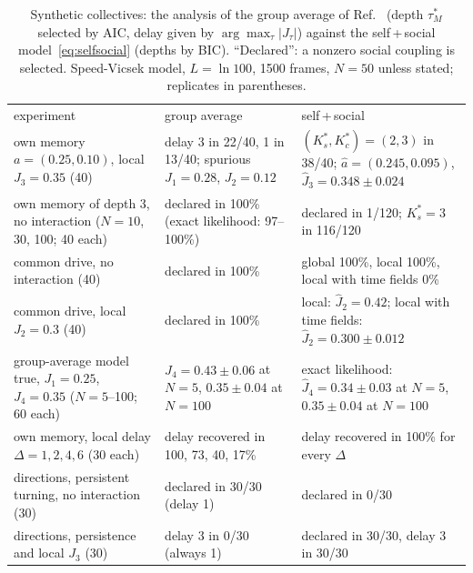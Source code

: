 \begin{table}[t]
\caption{Synthetic collectives: the analysis of the group average of Ref.~\cite{Agliari2024} (depth $\tau_M^*$ selected by AIC, delay given by $\arg\max_\tau|J_\tau|$) against the self\,+\,social model~\eqref{eq:selfsocial} (depths by BIC). ``Declared'': a nonzero social coupling is selected. Speed-Vicsek model, $L=\ln100$, 1500 frames, $N=50$ unless stated; replicates in parentheses.}
\label{tab:collective}
\begin{ruledtabular}
\begin{tabular}{>{\raggedright\arraybackslash}p{5.0cm}>{\raggedright\arraybackslash}p{5.6cm}>{\raggedright\arraybackslash}p{5.6cm}}
experiment & group average & self\,+\,social\\
\colrule
own memory $a=(0.25,0.10)$, local $J_3=0.35$ (40) & delay 3 in 22/40, 1 in 13/40; spurious $J_1=0.28$, $J_2=0.12$ & $(K_s^*,K_c^*)=(2,3)$ in 38/40; $\hat a=(0.245,0.095)$, $\hat J_3=0.348\pm0.024$\\
own memory of depth 3, no interaction ($N=10$, 30, 100; 40 each) & declared in 100\% (exact likelihood: 97--100\%) & declared in 1/120; $K_s^*=3$ in 116/120\\
common drive, no interaction (40) & declared in 100\% & global 100\%, local 100\%, local with time fields 0\%\\
common drive, local $J_2=0.3$ (40) & declared in 100\% & local: $\hat J_2=0.42$; local with time fields: $\hat J_2=0.300\pm0.012$\\
group-average model true, $J_1=0.25$, $J_4=0.35$ ($N=5$--100; 60 each) & $\hat J_4=0.43\pm0.06$ at $N=5$, $0.35\pm0.04$ at $N=100$ & exact likelihood: $\hat J_4=0.34\pm0.03$ at $N=5$, $0.35\pm0.04$ at $N=100$\\
own memory, local delay $\Delta=1,2,4,6$ (30 each) & delay recovered in 100, 73, 40, 17\% & delay recovered in 100\% for every $\Delta$\\
directions, persistent turning, no interaction (30) & declared in 30/30 (delay 1) & declared in 0/30\\
directions, persistence and local $J_3$ (30) & delay 3 in 0/30 (always 1) & declared in 30/30, delay 3 in 30/30\\
\end{tabular}
\end{ruledtabular}
\end{table}

